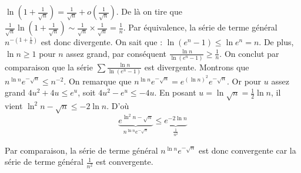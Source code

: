 {{$\ln \left(1+\frac{1}{\sqrt{n}}\right) = \frac{1}{\sqrt{n}} + o\left(\frac{1}{\sqrt{n}}\right)$.
De là on tire que $\frac{1}{\sqrt{n}}\ln{\left(1+\frac{1}{\sqrt{n}}\right)} 
\sim \frac{1}{\sqrt{n}} \times \frac{1}{\sqrt{n}} = \frac{1}{n}$.
Par équivalence, la série de terme général $n^{-\left(1+\frac{1}{n}\right) }$ est donc divergente.
On sait que :
$\ln{(e^n-1)} \le \ln{e^n} = n$. De plus, $ \ln n \ge 1$ pour $n$  assez grand, par conséquent
$\frac{\ln n}{\ln (e^n-1)} \ge \frac{1}{n}$. On conclut par comparaison 
que la série $\sum \frac{\ln n }{\ln{(e^n-1)}}$ est divergente.
Montrons que $n^{\ln n }e^{-\sqrt{n}} \le n^{-2}$.
On remarque que $ n^{\ln n }e^{-\sqrt{n}} = e^{(\ln n)^2}e^{-\sqrt{n}}$. 
Or pour $u$ assez grand $4u^2 + 4u \le e^u $, soit $4u^2 - e^u \le - 4u$.
En posant $u = \ln \sqrt{n} = \frac{1}{2} \ln n$, il vient $\ln^2{n} - \sqrt{n} \le -2\ln n$.
D'où 
\[
\underbrace{e^{\ln^2{n}-\sqrt{n}}}_{n^{\ln n }e^{-\sqrt{n}}} \le \underbrace{e^{-2\ln n }}_{\frac{1}{n^2}}
\]

Par comparaison, la série de terme général $n^{\ln n }e^{-\sqrt{n} }$ est donc convergente 
car la série de terme général $\frac{1}{n^2}$ est convergente.
}
}
